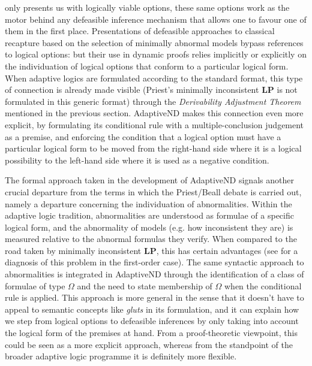 \documentclass[]{article}
\newtheorem{definition}{Definition}
\newcommand{\TurnADND}[2]
    { {#1}\vdash_{\textbf{\sf AdaptiveND}}  {#2}}
\newcommand{\TurnChecked}[2]
    { {#1}\vdash_{\textbf{\sf \checked}}  {#2}}
\begin{document}
 only presents us with logically viable options, these same options work as the motor behind any defeasible inference mechanism that allows one to favour one of them in the first place. Presentations of defeasible approaches to classical recapture based on the selection of minimally abnormal models bypass references to logical options: but their use in dynamic proofs relies implicitly or explicitly on the individuation of logical options that conform to a particular logical form. When adaptive logics are formulated according to the standard format, this type of connection is already made visible (Priest's minimally inconsistent \textbf{LP} is not formulated in this generic format) through the \emph{Derivability Adjustment Theorem} mentioned in the previous section. \textsf{AdaptiveND} makes this connection even more explicit, by formulating its conditional rule with a multiple-conclusion judgement as a premise, and enforcing the condition that a logical option must have a particular logical form to be moved from the right-hand side where it is a logical possibility to the left-hand side where it is used as a negative condition.

 The formal approach taken in the development of \textsf{AdaptiveND} signals another crucial departure from the terms in which the Priest/Beall debate is carried out, namely a departure concerning the individuation of abnormalities. Within the adaptive logic tradition, abnormalities are understood as formulae of a specific logical form, and the abnormality of models (e.g. how inconsistent they are) is measured relative to the abnormal formulas they verify. When compared to the road taken by minimally inconsistent \textbf{LP}, this has certain advantages (see \cite{Batens:Synthese:2000} for a diagnosis of this problem in the first-order case). The same syntactic approach to abnormalities is integrated in \textsf{AdaptiveND} through the identification of a class of formulae of type $\Omega$ and the need to state membership of $\Omega$ when the conditional rule is applied. This approach is more general in the sense that it doesn't have to appeal to semantic concepts like \emph{gluts} in its formulation, and it can explain how we step from logical options to defeasible inferences by only taking into account the logical form of the premises at hand. From a proof-theoretic viewpoint, this could be seen as a more explicit approach, whereas from the standpoint of the broader adaptive logic programme it is definitely more flexible.

%
\end{document}
